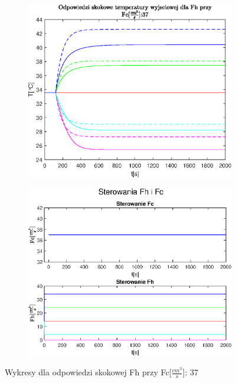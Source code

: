 \begin{figure}[h!]
   \begin{subfigure}[b]{0.6\textwidth}
      \includegraphics[width=1\linewidth]{img/step-responses-fh/stepResponseToutFh.eps}
      \caption{}
      \label{fig:fig:stepResponsesFh3}
   \end{subfigure}
       
   \begin{subfigure}[b]{0.6\textwidth}
      \includegraphics[width=1\linewidth]{img/step-responses-fh/stepResponseUFh.eps}
      \caption{}
      \label{fig:fig:stepResponsesFh4}
   \end{subfigure}
       
   \caption{Wykresy dla odpowiedzi skokowej Fh przy Fc[$\frac{cm^3}{s}$]: 37}
   \label{fig:stepResponsesFh}
\end{figure}
           
